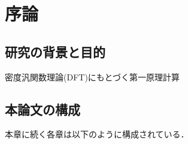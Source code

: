 \documentclass[main]{subfiles}
\begin{document}
\chapter{序論}
\section{研究の背景と目的}
密度汎関数理論(DFT)にもとづく第一原理計算
\section{本論文の構成}
本章に続く各章は以下のように構成されている．
\end{document}
